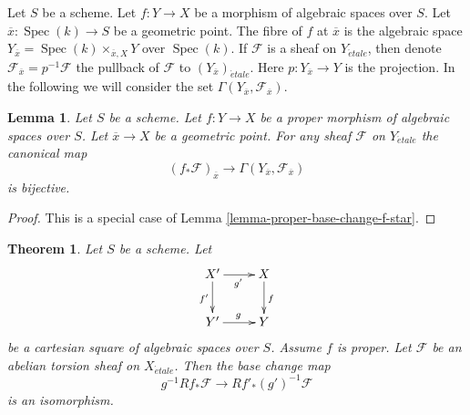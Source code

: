 \documentclass[10pt,a4paper]{amsart}
\theoremstyle{plain}
\newtheorem{theorem}[subsection]{Theorem}
\newtheorem{lemma}[subsection]{Lemma}
\theoremstyle{definition}
\theoremstyle{remark}
\numberwithin{equation}{subsection}
\def\Spec{\mathop{\mathrm{Spec}}}
\def\etale{{\acute{e}tale}}
\begin{document}
\noindent
Let $S$ be a scheme.
Let $f : Y \to X$ be a morphism of algebraic spaces over $S$. Let
$\overline{x} : \Spec(k) \to S$ be a geometric point. The fibre
of $f$ at $\overline{x}$ is the algebraic space
$Y_{\overline{x}} = \Spec(k) \times_{\overline{x}, X} Y$ over $\Spec(k)$.
If $\mathcal{F}$ is a sheaf on $Y_\etale$, then denote
$\mathcal{F}_{\overline{x}} = p^{-1}\mathcal{F}$
the pullback of $\mathcal{F}$ to $(Y_{\overline{x}})_\etale$.
Here $p : Y_{\overline{x}} \to Y$ is the projection.
In the following we will consider the set
$\Gamma(Y_{\overline{x}}, \mathcal{F}_{\overline{x}})$.

\begin{lemma}
\label{lemma-proper-pushforward-stalk}
Let $S$ be a scheme.
Let $f : Y \to X$ be a proper morphism of algebraic spaces over $S$. Let
$\overline{x} \to X$ be a geometric point.
For any sheaf $\mathcal{F}$ on $Y_\etale$
the canonical map
$$
(f_*\mathcal{F})_{\overline{x}} \longrightarrow
\Gamma(Y_{\overline{x}}, \mathcal{F}_{\overline{x}})
$$
is bijective.
\end{lemma}

\begin{proof}
This is a special case of Lemma \ref{lemma-proper-base-change-f-star}.
\end{proof}

\begin{theorem}
\label{theorem-proper-base-change}
Let $S$ be a scheme. Let
$$
\xymatrix{
X' \ar[r]_{g'} \ar[d]_{f'} & X \ar[d]^f \\
Y' \ar[r]^g & Y
}
$$
be a cartesian square of algebraic spaces over $S$.
Assume $f$ is proper.
Let $\mathcal{F}$ be an abelian torsion sheaf on $X_\etale$.
Then the base change map
$$
g^{-1}Rf_*\mathcal{F} \longrightarrow Rf'_*(g')^{-1}\mathcal{F}
$$
is an isomorphism.
\end{theorem}
\end{document}
